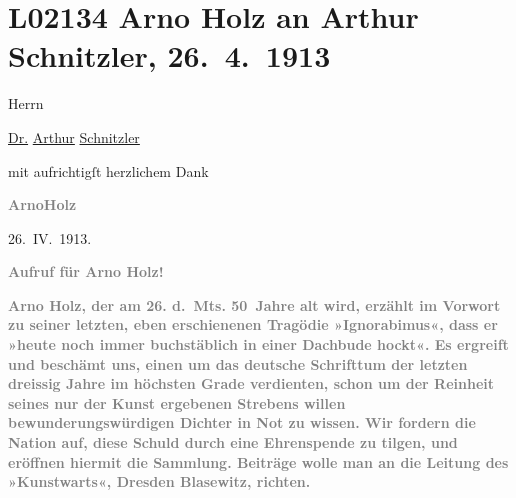 

\section[Arno Holz an Arthur Schnitzler, 26. 4. 1913]{L02134 Arno Holz an Arthur Schnitzler, 26. 4. 1913}
\nopagebreak{}
\rehead{ }\normalsize\beginnumbering{}
\toendnotes[C]{\smallbreak\pagebreak[2]}
\toendnotes[C]{\smallbreak}
\pstart
           \noindent{}{\pb}Herrn\pend
           
\pstart
           \uline{Dr.}{ }\uline{Arthur}{ }\uline{Schnitzler}\pend
           
\pstart
           mit aufrichtigſt herzlichem Dank\pend
           
\pstart
           \centering{}\textcolor{gray}{\textbf{ArnoHolz}}\pend
           
\pstart
           \centering{}26. IV. 1913.\pend
           
\pstart
           \centering{}{\pb}\textcolor{gray}{\textbf{Aufruf für Arno Holz!}}\pend
           
\pstart
           \textcolor{gray}{\textbf{Arno Holz, der am 26. d. Mts. 50 Jahre alt wird,
                  erzählt im Vorwort zu seiner letzten, eben erschienenen Tragödie »Ignorabimus«, dass er »heute noch immer
                  buchstäblich in einer Dachbude hockt«. Es ergreift und beschämt uns, einen um das
                  deutsche Schrifttum der letzten dreissig Jahre im höchsten Grade verdienten, schon
                  um der Reinheit seines nur der Kunst ergebenen Strebens willen
                  bewunderungswürdigen Dichter in Not zu wissen. Wir fordern die Nation auf, diese
                  Schuld durch eine Ehrenspende zu tilgen, und eröffnen hiermit die Sammlung.
                  Beiträge wolle man an die Leitung des »Kunstwarts«, Dresden Blasewitz,
                  richten.}}\pend
           
